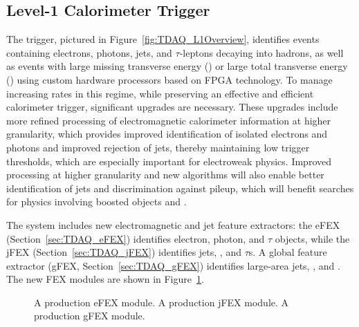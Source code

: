 \documentclass[cernpreprint, atlasdraft=false, UKenglish,british,orcidlogo, texmf, orcidlogo]{atlasdoc}
\begin{document}
\subsection{Level-1 Calorimeter Trigger}\label{sec:TDAQ_L1Calo}
The  trigger, pictured in Figure~\ref{fig:TDAQ_L1Overview}, identifies events containing electrons, photons, jets, and $\tau$-leptons decaying into hadrons, as well as events with large missing transverse energy (\MET) or large total transverse energy (\sumET) using custom hardware processors based on \gls{FPGA} technology. To manage increasing rates in this regime, while preserving an effective and efficient calorimeter trigger, significant upgrades are necessary.  These upgrades include more refined processing of electromagnetic calorimeter information at higher granularity, which provides improved identification of isolated electrons and photons and improved rejection of jets, thereby maintaining low trigger thresholds, which are especially important for electroweak physics.  Improved processing at higher granularity and new algorithms will also enable better identification of jets and discrimination against pileup, which will benefit searches for physics involving boosted objects and \MET.
 
The \RunThr system includes new electromagnetic and jet feature extractors: the \gls{eFEX} (Section~\ref{sec:TDAQ_eFEX}) identifies electron, photon, and $\tau$ objects, while the \gls{jFEX} (Section~\ref{sec:TDAQ_jFEX}) identifies jets, \MET, and $\tau$s.  A global feature extractor (\gls{gFEX}, Section~\ref{sec:TDAQ_gFEX}) identifies large-area jets, \MET, and \sumET.
The new \gls{FEX} modules are shown in Figure~\ref{fig:TDAQL1CaloFEXPhotos}.
\begin{figure}[htbp]
\centering
{}
\caption{
\protect{} A production \gls{eFEX} module.
\protect{} A production \gls{jFEX} module.
\protect{} A production \gls{gFEX} module.
}
\label{fig:TDAQL1CaloFEXPhotos}
\end{figure}
 
\end{document}
